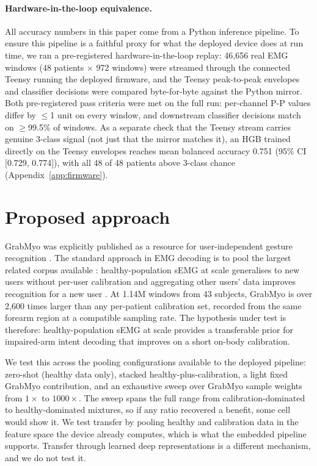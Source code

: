 \documentclass{article}
\begin{document}
\paragraph{Hardware-in-the-loop equivalence.} All accuracy numbers in this paper come from a Python inference pipeline. To ensure this pipeline is a faithful proxy for what the deployed device does at run time, we ran a pre-registered hardware-in-the-loop replay: 46{,}656 real EMG windows (48 patients $\times$ 972 windows) were streamed through the connected Teensy running the deployed firmware, and the Teensy peak-to-peak envelopes and classifier decisions were compared byte-for-byte against the Python mirror. Both pre-registered pass criteria were met on the full run: per-channel P-P values differ by $\leq$1 unit on every window, and downstream classifier decisions match on $\geq$99.5\% of windows. As a separate check that the Teensy stream carries genuine 3-class signal (not just that the mirror matches it), an HGB trained directly on the Teensy envelopes reaches mean balanced accuracy 0.751 (95\% CI [0.729, 0.774]), with all 48 of 48 patients above 3-class chance (Appendix~\ref{app:firmware}).

\section{Proposed approach}

GrabMyo was explicitly published as a resource for user-independent gesture recognition \citep{pradhan2022, grabmyo2022physionet}. The standard approach in EMG decoding is to pool the largest related corpus available \citep{wu2023}: healthy-population sEMG at scale generalises to new users without per-user calibration \citep{kaifosh2025, olsson2026} and aggregating other users' data improves recognition for a new user \citep{coteallard2019}. At 1.14M windows from 43 subjects, GrabMyo is over 2{,}600 times larger than any per-patient calibration set, recorded from the same forearm region at a compatible sampling rate. The hypothesis under test is therefore: healthy-population sEMG at scale provides a transferable prior for impaired-arm intent decoding that improves on a short on-body calibration.

We test this across the pooling configurations available to the deployed pipeline: zero-shot (healthy data only), stacked healthy-plus-calibration, a light fixed GrabMyo contribution, and an exhaustive sweep over GrabMyo sample weights from $1\times$ to $1000\times$. The sweep spans the full range from calibration-dominated to healthy-dominated mixtures, so if any ratio recovered a benefit, some cell would show it. We test transfer by pooling healthy and calibration data in the feature space the device already computes, which is what the embedded pipeline supports. Transfer through learned deep representations is a different mechanism, and we do not test it.
\end{document}
